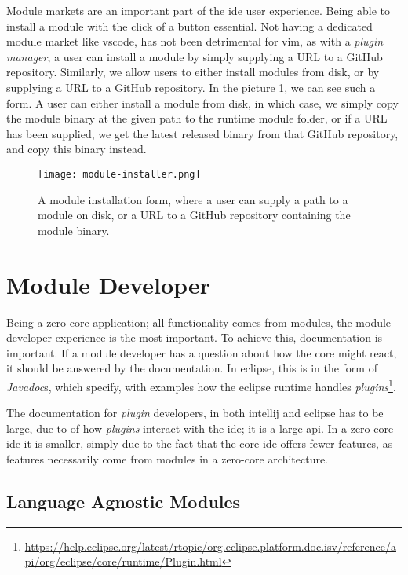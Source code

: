Module markets are an important part of the \gls*{ide} user experience. Being
able to install a module with the click of a button essential. Not having a
dedicated module market like \gls*{vscode}, has not been detrimental for
\gls*{vim}, as with a \textit{plugin manager}, a user can install a module by
simply supplying a URL to a GitHub repository. Similarly, we allow users to
either install modules from disk, or by supplying a URL to a GitHub repository.
In the picture \ref{pic:moduleInstaller}, we can see such a form. A user can
either install a module from disk, in which case, we simply copy the module
binary at the given path to the runtime module folder, or if a URL has been
supplied, we get the latest released binary from that GitHub repository, and
copy this binary instead.

\begin{figure}
  \centering
  \texttt{[image: module-installer.png]}
  \caption{
    A module installation form, where a user can supply a path to a module on
    disk, or a URL to a GitHub repository containing the module binary.
  }
  \label{pic:moduleInstaller}
\end{figure}

\section{Module Developer}

Being a zero-core application; all functionality comes from modules, the module
developer experience is the most important. To achieve this, documentation is
important. If a module developer has a question about how the core might react,
it should be answered by the documentation. In \gls*{eclipse}, this is in the
form of \textit{Javadoc}s, which specify, with examples how the \gls*{eclipse}
runtime handles \textit{plugins}\footnote{\url{https://help.eclipse.org/latest/rtopic/org.eclipse.platform.doc.isv/reference/api/org/eclipse/core/runtime/Plugin.html}}.

The documentation for \textit{plugin} developers, in both \gls*{intellij} and
\gls*{eclipse} has to be large, due to of how \textit{plugins} interact with the
\gls*{ide}; it is a large \gls*{api}. In a zero-core \gls*{ide} it is smaller,
simply due to the fact that the core \gls*{ide} offers fewer features, as features
necessarily come from modules in a zero-core architecture.

\subsection{Language Agnostic Modules}

